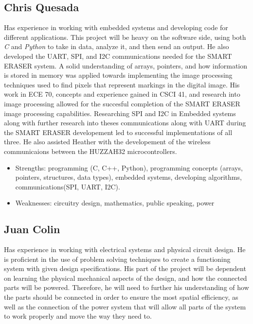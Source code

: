  \subsection{Chris Quesada}
Has experience in working with embedded systems and developing code for different applications. This project will be heavy on the software side, using both \textit{C} and \textit{Python} to take in data, analyze it, and then send an output.  He also developed the UART, SPI, and I2C communications needed for the SMART ERASER system. A solid understanding  of arrays, pointers, and how information is stored in memory was applied towards implementing the  image processing techniques used to find pixels that represent markings in the digital image. His work in ECE 70, concepts and experience gained in CSCI 41, and research into image processing allowed for the succesful completion of the SMART ERASER  image processing capabilities. Researching SPI and I2C in Embedded systems along with further research into theses communications along with UART during the SMART ERASER developement led to successful implementations of all three. He also assisted Heather with the developement of the wireless communicaions between the HUZZAH32 microcontrollers.
\begin{itemize}
	\item Strengths: programming (C, C++, Python),  programming concepts (arrays, pointers, structures, data types), embedded systems, developing algorithms, communications(SPI, 		UART, I2C).
	
	\item Weaknesses:  circuitry design, mathematics, public speaking, power
\end{itemize} \par
 \subsection{Juan Colin}
  Has experience in working with electrical systems and physical circuit design. He is proficient in the use of problem solving techniques to create a functioning system with given design specifications. His part of the project will be dependent on learning the physical mechanical aspects of the design, and how the connected parts will be powered. Therefore, he will need to further his understanding of how the parts should be connected in order to ensure the most spatial efficiency, as well as the connection of the power system that will allow all parts of the system to work properly and move the way they need to.
  
